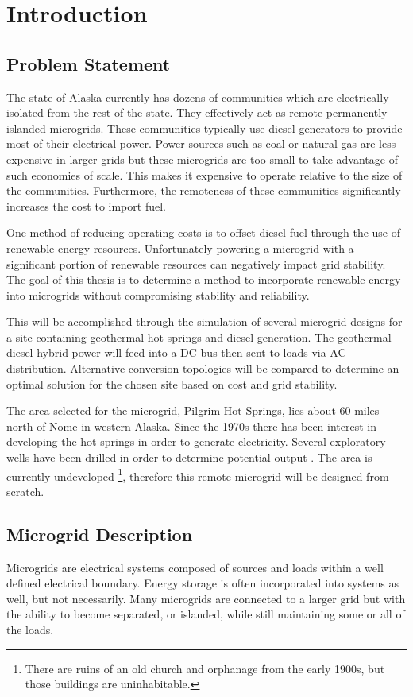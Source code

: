 \chapter{Introduction}

\section{Problem Statement}
The state of Alaska currently has dozens of communities which are electrically isolated from the rest of the state. They effectively act as remote permanently islanded microgrids. These communities typically use diesel generators to provide most of their electrical power. Power sources such as coal or natural gas are less expensive in larger grids but these microgrids are too small to take advantage of such economies of scale. This makes it expensive to operate relative to the size of the communities. Furthermore, the remoteness of these communities significantly increases the cost to import fuel.

One method of reducing operating costs is to offset diesel fuel through the use of renewable energy resources. Unfortunately powering a microgrid with a significant portion of renewable resources can negatively impact grid stability. The goal of this thesis is to determine a method to incorporate renewable energy into microgrids without compromising stability and reliability. 

This will be accomplished through the simulation of several microgrid designs for a site containing geothermal hot springs and diesel generation. The geothermal-diesel hybrid power will feed into a DC bus then sent to loads via AC distribution. Alternative conversion topologies will be compared to determine an optimal solution for the chosen site based on cost and grid stability.

The area selected for the microgrid, Pilgrim Hot Springs, lies about 60 miles north of Nome in western Alaska. Since the 1970s there has been interest in developing the hot springs in order to generate electricity. Several exploratory wells have been drilled in order to determine potential output \cite{Holdmann2013}. The area is currently undeveloped \footnote{There are ruins of an old church and orphanage from the early 1900s, but those buildings are uninhabitable.}, therefore this remote microgrid will be designed from scratch.

\section{Microgrid Description}
Microgrids are electrical systems composed of sources and loads within a well defined electrical boundary. Energy storage is often incorporated into systems as well, but not necessarily. Many microgrids are connected to a larger grid but with the ability to become separated, or islanded, while still maintaining some or all of the loads.

